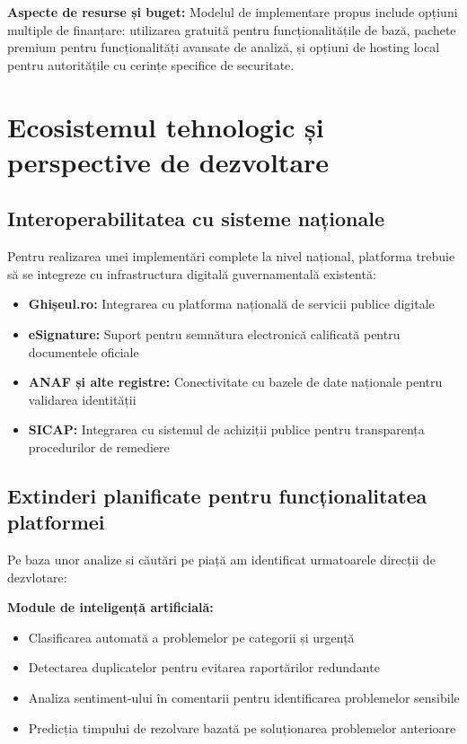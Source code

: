 \documentclass[12pt,a4paper]{report}
\begin{document}
\textbf{Aspecte de resurse și buget:} Modelul de implementare propus include opțiuni multiple de finanțare: utilizarea gratuită pentru funcționalitățile de bază, pachete premium pentru funcționalități avansate de analiză, și opțiuni de hosting local pentru autoritățile cu cerințe specifice de securitate.

\section{Ecosistemul tehnologic și perspective de dezvoltare}   

\subsection{Interoperabilitatea cu sisteme naționale}

Pentru realizarea unei implementări complete la nivel național, platforma trebuie să se integreze cu infrastructura digitală guvernamentală existentă:

\begin{itemize}
\item \textbf{Ghișeul.ro:} Integrarea cu platforma națională de servicii publice digitale
\item \textbf{eSignature:} Suport pentru semnătura electronică calificată pentru documentele oficiale
\item \textbf{ANAF și alte registre:} Conectivitate cu bazele de date naționale pentru validarea identității
\item \textbf{SICAP:} Integrarea cu sistemul de achiziții publice pentru transparența procedurilor de remediere
\end{itemize}

\subsection{Extinderi planificate pentru funcționalitatea platformei}

Pe baza unor analize si căutări pe piață am identificat urmatoarele direcții de dezvlotare:

\textbf{Module de inteligență artificială:}
\begin{itemize}
\item Clasificarea automată a problemelor pe categorii și urgență
\item Detectarea duplicatelor pentru evitarea raportărilor redundante
\item Analiza sentiment-ului în comentarii pentru identificarea problemelor sensibile
\item Predicția timpului de rezolvare bazată pe soluționarea problemelor anterioare
\end{itemize}
\end{document}
